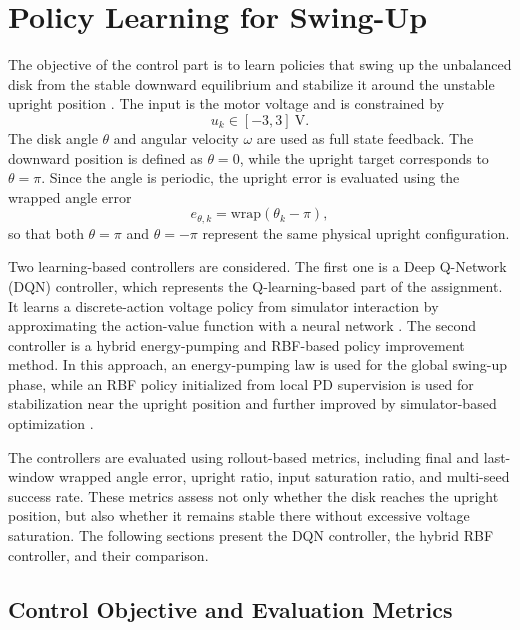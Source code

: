 
\section{Policy Learning for Swing-Up}


The objective of the control part is to learn policies that swing up the
unbalanced disk from the stable downward equilibrium and stabilize it around
the unstable upright position \cite{assignment5sc28,course5sc28}. The input is the motor voltage and is constrained
by
\begin{equation}
    u_k \in [-3,3]~\mathrm{V}.
\label{eq:policy_voltage_limit}
\end{equation}
The disk angle $\theta$ and angular velocity $\omega$ are used as full state
feedback. The downward position is defined as $\theta=0$, while the upright
target corresponds to $\theta=\pi$. Since the angle is periodic, the upright
error is evaluated using the wrapped angle error
\begin{equation}
    e_{\theta,k}=\mathrm{wrap}(\theta_k-\pi),
\label{eq:policy_upright_error}
\end{equation}
so that both $\theta=\pi$ and $\theta=-\pi$ represent the same physical upright
configuration.

Two learning-based controllers are considered. The first one is a Deep
Q-Network (DQN) controller, which represents the Q-learning-based part of the
assignment. It learns a discrete-action voltage policy from simulator
interaction by approximating the action-value function with a neural network
\cite{course5sc28,watkins1992qlearning,mnih2015dqn}.
The second controller is a hybrid energy-pumping and RBF-based policy
improvement method. In this approach, an energy-pumping law is used for the
global swing-up phase, while an RBF policy initialized from local PD supervision
is used for stabilization near the upright position and further improved by
simulator-based optimization \cite{course5sc28,broomhead1988rbf}.

The controllers are evaluated using rollout-based metrics, including final and
last-window wrapped angle error, upright ratio, input saturation ratio, and
multi-seed success rate. These metrics assess not only whether the disk reaches
the upright position, but also whether it remains stable there without excessive
voltage saturation. The following sections present the DQN controller, the
hybrid RBF controller, and their comparison.



\subsection{Control Objective and Evaluation Metrics}

